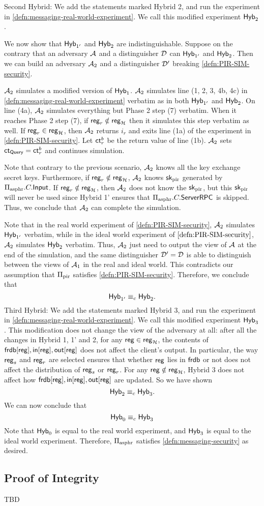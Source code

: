 Second Hybrid: We add the statements marked Hybrid 2, and run the experiment in \cref{defn:messaging-real-world-experiment}. We call this modified experiment $\mathsf{Hyb}_{2}$.

We now show that $\mathsf{Hyb}_{1'}$ and $\mathsf{Hyb}_{2}$ are indistinguishable. Suppose on the contrary that an adversary $\mathcal{A}$ and a distinguisher $\mathcal{D}$ can $\mathsf{Hyb}_{1'}$ and $\mathsf{Hyb}_{2}$. Then we can build an adversary $\mathcal{A}_2$ and a distinguisher $\mathcal{D}'$ breaking \cref{defn:PIR-SIM-security}. 

$\mathcal{A}_2$ simulates a modified version of $\mathsf{Hyb}_1$. $\mathcal{A}_2$ simulates line (1, 2, 3, 4b, 4c) in \cref{defn:messaging-real-world-experiment} verbatim as in both $\mathsf{Hyb}_{1'}$ and $\mathsf{Hyb}_2$. On line (4a), $\mathcal{A}_2$ simulates everything but Phase 2 step (7) verbatim. When it reaches Phase 2 step (7), if $\mathsf{reg}_r \notin \mathsf{reg}_{\mathcal{H}}$ then it simulates this step verbatim as well. If $\mathsf{reg}_r \in \mathsf{reg}_{\mathcal{H}}$, then $\mathcal{A}_2$ returns $i_r$ and exits line (1a) of the experiment in \cref{defn:PIR-SIM-security}. Let $\mathsf{ct}^b_r$ be the return value of line (1b). $\mathcal{A}_2$ sets $\mathsf{ct}_{\mathsf{Query}} = \mathsf{ct}^b_r$ and continues simulation.

Note that contrary to the previous scenario, $\mathcal{A}_2$ knows all the key exchange secret keys. Furthermore, if $\mathsf{reg}_r \notin \mathsf{reg}_{\mathcal{H}}$, $\mathcal{A}_2$ knows ${\mathsf{sk}}_{\text{pir}}$ generated by $\Pi_{\text{asphr}}.C.\mathsf{Input}$. If $\mathsf{reg}_r \notin \mathsf{reg}_{\mathcal{H}}$, then $\mathcal{A}_2$ does not know the ${\mathsf{sk}}_{\text{pir}}$, but this ${\mathsf{sk}}_{\text{pir}}$ will never be used since Hybrid 1' ensures that $\Pi_{\text{asphr}}.C.\mathsf{ServerRPC}$ is skipped. Thus, we conclude that $\mathcal{A}_2$ can complete the simulation.

Note that in the real world experiment of \cref{defn:PIR-SIM-security}, $\mathcal{A}_2$ simulates $\mathsf{Hyb}_{1'}$ verbatim, while in the ideal world experiment of $\cref{defn:PIR-SIM-security}$, $\mathcal{A}_2$ simulates $\mathsf{Hyb}_2$ verbatim. Thus, $\mathcal{A}_2$ just need to output the view of $\mathcal{A}$ at the end of the simulation, and the same distinguisher $\mathcal{D}' = \mathcal{D}$ is able to distinguish between the views of $\mathcal{A}_1$ in the real and ideal world. This contradicts our assumption that $\Pi_{\text{pir}}$ satisfies \cref{defn:PIR-SIM-security}. Therefore, we conclude that
$$\mathsf{Hyb}_{1'} \equiv_c \mathsf{Hyb}_2.$$
Third Hybrid: We add the statements marked Hybrid 3, and run the experiment in \cref{defn:messaging-real-world-experiment}. We call this modified experiment $\mathsf{Hyb}_{3}$. This modification does not change the view of the adversary at all: after all the changes in Hybrid 1, 1' and 2, for any $\mathsf{reg} \in \mathsf{reg}_{\mathcal{H}}$, the contents of $\mathsf{frdb}[\mathsf{reg}], \mathsf{in}[\mathsf{reg}], \mathsf{out}[\mathsf{reg}]$ does not affect the client's output. In particular, the way $\mathsf{reg}_s$ and $\mathsf{reg}_r$ are selected ensures that whether $\mathsf{reg}$ lies in $\mathsf{frdb}$ or not does not affect the distribution of $\mathsf{reg}_s$ or $\mathsf{reg}_r$. For any $\mathsf{reg} \notin \mathsf{reg}_{\mathcal{H}}$, Hybrid 3 does not affect how $\mathsf{frdb}[\mathsf{reg}], \mathsf{in}[\mathsf{reg}], \mathsf{out}[\mathsf{reg}]$ are updated. So we have shown
$$\mathsf{Hyb}_{2} \equiv_c \mathsf{Hyb}_3.$$
We can now conclude that
$$\mathsf{Hyb}_0 \equiv_c \mathsf{Hyb}_3$$
Note that $\mathsf{Hyb}_0$ is equal to the real world experiment, and $\mathsf{Hyb}_3$ is equal to the ideal world experiment. Therefore, $\Pi_{\text{asphr}}$ satisfies \cref{defn:messaging-security} as desired. 

\subsection{Proof of Integrity}
TBD
